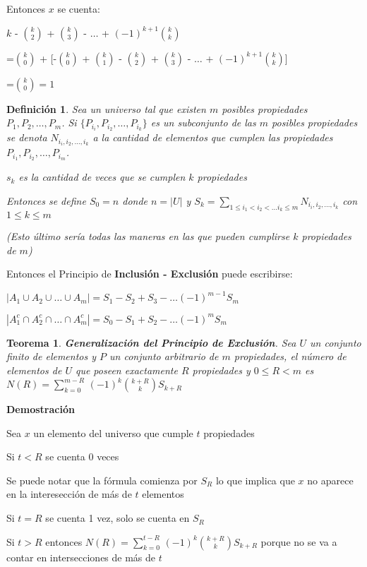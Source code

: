 \documentclass[a4paper,12pt]{report}
\newtheorem*{teo}{Teorema}
\newtheorem*{dfn}{Definición}
\begin{document}
Entonces $x$ se cuenta:

$k$ - $k\choose 2$ + $k\choose 3$ - $\dots$ + $(-1)^{k+1}$$k\choose k$

=$k\choose 0$ + [-$k\choose 0$ + $k\choose 1$ - $k\choose 2$ + $k\choose 3$ - $\dots$ + $(-1)^{k+1}$$k\choose k$]

=$k\choose 0$$=1$




\begin{dfn}
Sea un universo tal que existen $m$ posibles propiedades $P_1,P_2,\dots,P_m$. Si $\{P_{i_i},P_{i_2},\dots,P_{i_k}\}$ es un subconjunto de las $m$ posibles propiedades se denota 
$N_{i_i,i_2,\dots,i_k}$ a la cantidad de elementos que cumplen las propiedades 
$P_{i_1},P_{i_2},\dots,P_{i_m}$. 

$s_k$ es la cantidad de veces que se cumplen $k$ propiedades
 
Entonces se define $S_0=n$ donde $n=|U|$ y 
$S_k=\sum_{1\leq i_1 < i_2 < \dots i_k \leq m} N_{i_i,i_2,\dots,i_k}$ con $1\leq k \leq m$

(Esto último sería todas las maneras en las que pueden cumplirse $k$ propiedades de $m$)
\end{dfn}


Entonces el Principio de \textbf{Inclusión - Exclusión} puede escribirse:

$|A_1\cup A_2\cup \dots \cup A_m| = S_1 - S_2 + S_3 - \dots (-1)^{m-1}S_m$

$|A_1^c\cap A_2^c\cap \dots \cap A_m^c| = S_0 - S_1 + S_2 - \dots (-1)^{m}S_m$

\begin{teo}
 \textbf{Generalización del Principio de Exclusión}. Sea $U$ un conjunto finito de elementos y $P$ un conjunto arbitrario de $m$ propiedades, el número de elementos de $U$ que poseen exactamente $R$ propiedades y $0\leq R < m$ es
 $N(R) = \sum^{m-R}_{k=0}\, (-1)^k$${k+R}\choose{k}$$S_{k+R}$
\end{teo}

\textbf{Demostración}

Sea $x$ un elemento del universo que cumple $t$ propiedades

Si $t<R$ se cuenta 0 veces

Se puede notar que la fórmula comienza por $S_R$ lo que implica que $x$ no aparece en la interesección de más de $t$ elementos

Si $t=R$ se cuenta 1 vez, solo se cuenta en $S_R$

Si $t>R$ entonces $N(R) = \sum^{t-R}_{k=0}\, (-1)^k$${k+R}\choose{k}$$S_{k+R}$ porque no se va a contar en intersecciones de más de $t$
\end{document}
